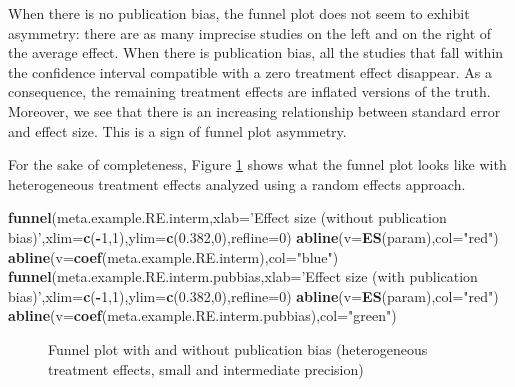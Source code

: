 \documentclass[]{book}
\newenvironment{Shaded}{\begin{snugshade}}{\end{snugshade}}
\newcommand{\DataTypeTok}[1]{\textcolor[rgb]{0.13,0.29,0.53}{#1}}
\newcommand{\DecValTok}[1]{\textcolor[rgb]{0.00,0.00,0.81}{#1}}
\newcommand{\FloatTok}[1]{\textcolor[rgb]{0.00,0.00,0.81}{#1}}
\newcommand{\KeywordTok}[1]{\textcolor[rgb]{0.13,0.29,0.53}{\textbf{#1}}}
\newcommand{\NormalTok}[1]{#1}
\newcommand{\OperatorTok}[1]{\textcolor[rgb]{0.81,0.36,0.00}{\textbf{#1}}}
\newcommand{\StringTok}[1]{\textcolor[rgb]{0.31,0.60,0.02}{#1}}
\theoremstyle{definition}
\theoremstyle{definition}
\theoremstyle{definition}
\theoremstyle{remark}
\begin{document}
When there is no publication bias, the funnel plot does not seem to exhibit asymmetry: there are as many imprecise studies on the left and on the right of the average effect.
When there is publication bias, all the studies that fall within the confidence interval compatible with a zero treatment effect disappear.
As a consequence, the remaining treatment effects are inflated versions of the truth.
Moreover, we see that there is an increasing relationship between standard error and effect size.
This is a sign of funnel plot asymmetry.

For the sake of completeness, Figure \ref{fig:FunnelPlotRE} shows what the funnel plot looks like with heterogeneous treatment effects analyzed using a random effects approach.

\begin{Shaded}
\begin{Highlighting}[]
\KeywordTok{funnel}\NormalTok{(meta.example.RE.interm,}\DataTypeTok{xlab=}\StringTok{'Effect size (without publication bias)'}\NormalTok{,}\DataTypeTok{xlim=}\KeywordTok{c}\NormalTok{(}\OperatorTok{-}\DecValTok{1}\NormalTok{,}\DecValTok{1}\NormalTok{),}\DataTypeTok{ylim=}\KeywordTok{c}\NormalTok{(}\FloatTok{0.382}\NormalTok{,}\DecValTok{0}\NormalTok{),}\DataTypeTok{refline=}\DecValTok{0}\NormalTok{)}
\KeywordTok{abline}\NormalTok{(}\DataTypeTok{v=}\KeywordTok{ES}\NormalTok{(param),}\DataTypeTok{col=}\StringTok{"red"}\NormalTok{)}
\KeywordTok{abline}\NormalTok{(}\DataTypeTok{v=}\KeywordTok{coef}\NormalTok{(meta.example.RE.interm),}\DataTypeTok{col=}\StringTok{"blue"}\NormalTok{)}
\KeywordTok{funnel}\NormalTok{(meta.example.RE.interm.pubbias,}\DataTypeTok{xlab=}\StringTok{'Effect size (with publication bias)'}\NormalTok{,}\DataTypeTok{xlim=}\KeywordTok{c}\NormalTok{(}\OperatorTok{-}\DecValTok{1}\NormalTok{,}\DecValTok{1}\NormalTok{),}\DataTypeTok{ylim=}\KeywordTok{c}\NormalTok{(}\FloatTok{0.382}\NormalTok{,}\DecValTok{0}\NormalTok{),}\DataTypeTok{refline=}\DecValTok{0}\NormalTok{)}
\KeywordTok{abline}\NormalTok{(}\DataTypeTok{v=}\KeywordTok{ES}\NormalTok{(param),}\DataTypeTok{col=}\StringTok{"red"}\NormalTok{)}
\KeywordTok{abline}\NormalTok{(}\DataTypeTok{v=}\KeywordTok{coef}\NormalTok{(meta.example.RE.interm.pubbias),}\DataTypeTok{col=}\StringTok{"green"}\NormalTok{)}
\end{Highlighting}
\end{Shaded}

\begin{figure}[htbp]

{\centering {}

}

\caption{Funnel plot with and without publication bias (heterogeneous treatment effects, small and intermediate precision)}\label{fig:FunnelPlotRE}
\end{figure}
\end{document}
